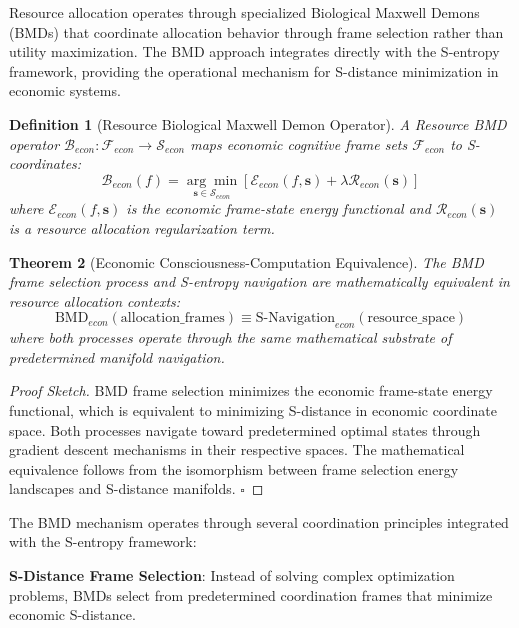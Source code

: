 \documentclass[12pt,a4paper]{article}
\newtheorem{theorem}{Theorem}
\newtheorem{definition}[theorem]{Definition}
\begin{document}
Resource allocation operates through specialized Biological Maxwell Demons (BMDs) that coordinate allocation behavior through frame selection rather than utility maximization. The BMD approach integrates directly with the S-entropy framework, providing the operational mechanism for S-distance minimization in economic systems.

\begin{definition}[Resource Biological Maxwell Demon Operator]
A Resource BMD operator $\mathcal{B}_{econ}: \mathcal{F}_{econ} \to \mathcal{S}_{econ}$ maps economic cognitive frame sets $\mathcal{F}_{econ}$ to S-coordinates:
\begin{equation}
\mathcal{B}_{econ}(f) = \underset{\mathbf{s} \in \mathcal{S}_{econ}}{\arg\min} \left[ \mathcal{E}_{econ}(f, \mathbf{s}) + \lambda \mathcal{R}_{econ}(\mathbf{s}) \right]
\end{equation}
where $\mathcal{E}_{econ}(f, \mathbf{s})$ is the economic frame-state energy functional and $\mathcal{R}_{econ}(\mathbf{s})$ is a resource allocation regularization term.
\end{definition}

\begin{theorem}[Economic Consciousness-Computation Equivalence]
The BMD frame selection process and S-entropy navigation are mathematically equivalent in resource allocation contexts:
\begin{equation}
\text{BMD}_{econ}(\text{allocation\_frames}) \equiv \text{S-Navigation}_{econ}(\text{resource\_space})
\end{equation}
where both processes operate through the same mathematical substrate of predetermined manifold navigation.
\end{theorem}

\begin{proof}[Proof Sketch]
BMD frame selection minimizes the economic frame-state energy functional, which is equivalent to minimizing S-distance in economic coordinate space. Both processes navigate toward predetermined optimal states through gradient descent mechanisms in their respective spaces. The mathematical equivalence follows from the isomorphism between frame selection energy landscapes and S-distance manifolds. $\square$
\end{proof}

The BMD mechanism operates through several coordination principles integrated with the S-entropy framework:

\textbf{S-Distance Frame Selection}: Instead of solving complex optimization problems, BMDs select from predetermined coordination frames that minimize economic S-distance.
\end{document}
